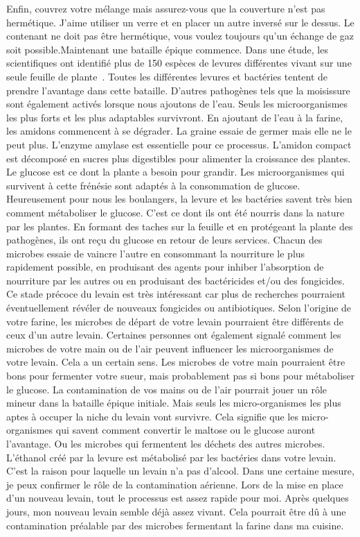Enfin, couvrez votre mélange mais assurez-vous que la couverture n'est
pas hermétique. J'aime utiliser un verre et en placer un autre
inversé sur le dessus. Le contenant ne doit pas être hermétique,
vous voulez toujours qu'un échange de gaz soit possible.Maintenant une bataille épique commence. Dans une étude, les scientifiques
ont identifié plus de 150 espèces de levures différentes vivant
sur une seule feuille de plante~\cite{yeasts+biocontrol+agent}.
Toutes les différentes levures et bactéries tentent de prendre
l'avantage dans cette bataille. D'autres pathogènes tels que la moisissure
sont également activés lorsque nous ajoutons de l'eau. Seuls les microorganismes
les plus forts et les plus adaptables survivront. En ajoutant de l'eau à la
farine, les amidons commencent à se dégrader. La graine essaie de
germer mais elle ne le peut plus. L'enzyme amylase est essentielle pour ce processus. L'amidon compact est décomposé en sucres
plus digestibles pour alimenter la croissance des plantes. Le glucose est ce dont
la plante a besoin pour grandir. Les microorganismes qui survivent
à cette frénésie sont adaptés à la consommation de glucose. Heureusement pour nous
les boulangers, la levure et les bactéries savent très bien comment métaboliser
le glucose. C'est ce dont ils ont été nourris dans la nature par les plantes.
En formant des taches sur la feuille et en protégeant la plante des
pathogènes, ils ont reçu du glucose en retour de leurs services.
Chacun des microbes essaie de vaincre l'autre en consommant la
nourriture le plus rapidement possible, en produisant des agents pour inhiber l'absorption de nourriture par les autres ou en produisant
des bactéricides et/ou des fongicides. Ce stade précoce du levain
est très intéressant car plus de recherches pourraient éventuellement révéler
de nouveaux fongicides ou antibiotiques. Selon l'origine de votre farine,
les microbes de départ de votre levain pourraient être différents
de ceux d'un autre levain. Certaines personnes ont également signalé
comment les microbes de votre main ou de l'air peuvent influencer les microorganismes de votre levain. Cela a un certain sens. Les
microbes de votre main pourraient être bons pour fermenter votre sueur, mais
probablement pas si bons pour métaboliser le glucose. La contamination
de vos mains ou de l'air pourrait jouer un rôle mineur dans la bataille épique initiale.
Mais seuls les micro-organismes les plus aptes à occuper la niche du levain
vont survivre. Cela signifie que les micro-organismes qui savent
comment convertir le maltose ou le glucose auront l'avantage. Ou les
microbes qui fermentent les déchets des autres microbes. L'éthanol créé
par la levure est métabolisé par les bactéries dans votre levain. C'est
la raison pour laquelle un levain n'a pas d'alcool. Dans une certaine mesure, je peux confirmer le rôle de la contamination aérienne.
Lors de la mise en place d'un nouveau levain,
tout le processus est assez rapide pour moi. Après quelques
jours, mon nouveau levain semble déjà assez vivant. Cela pourrait
être dû à une contamination préalable par des microbes fermentant la farine dans
ma cuisine.

